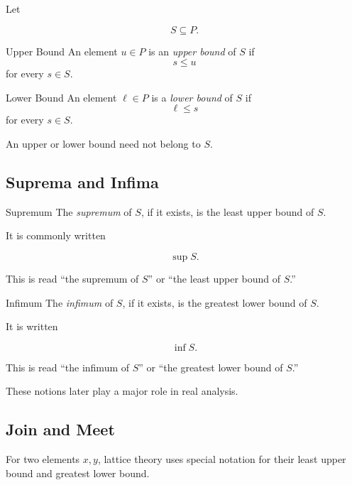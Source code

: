 Let

\[ S\subseteq P. \]

\begin{definitionbox}{Upper Bound}
An element \(u\in P\) is an \emph{upper bound} of \(S\) if
\[ s\leq u \]
for every \(s\in S\).
\end{definitionbox}

\begin{definitionbox}{Lower Bound}
An element \(\ell\in P\) is a \emph{lower bound} of \(S\) if
\[ \ell\leq s \]
for every \(s\in S\).
\end{definitionbox}

An upper or lower bound need not belong to \(S\).

\subsection{Suprema and Infima}
\label{subsec:suprema-infima-lattice}

\begin{definitionbox}{Supremum}
The \emph{supremum} of \(S\), if it exists, is the least upper bound of
\(S\).
\end{definitionbox}

It is commonly written

\[ \sup S. \]

This is read ``the supremum of \(S\)'' or ``the least upper bound of \(S\).''

\begin{definitionbox}{Infimum}
The \emph{infimum} of \(S\), if it exists, is the greatest lower bound of
\(S\).
\end{definitionbox}

It is written

\[ \inf S. \]

This is read ``the infimum of \(S\)'' or ``the greatest lower bound of
\(S\).''

These notions later play a major role in real analysis.

\subsection{Join and Meet}
\label{subsec:join-meet}

For two elements \(x,y\), lattice theory uses special notation for their
least upper bound and greatest lower bound.

